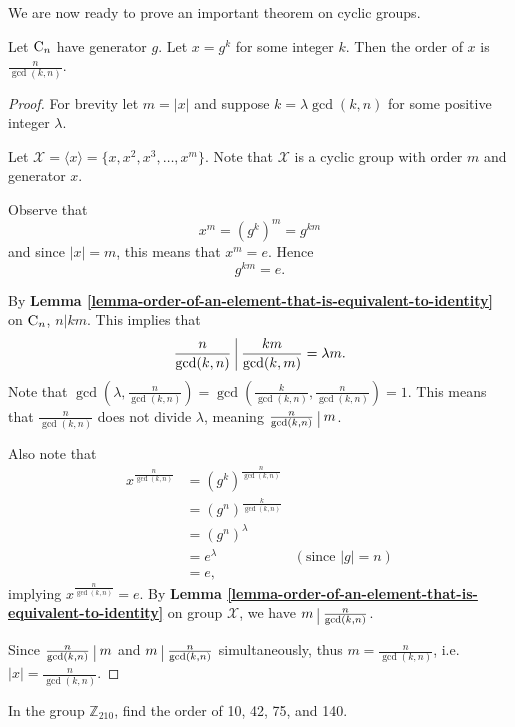 We are now ready to prove an important theorem on cyclic groups.
\begin{theorem}\label{thrm-order-of-element-in-cyclic-group}
    Let $\mathrm{C}_{n}$ have generator $g$. Let $x = g^k$ for some integer $k$. Then the order of $x$ is $\frac{n}{\gcd(k,n)}$.
\end{theorem}
\begin{proof}
    For brevity let $m = |x|$ and suppose $k = \lambda \gcd(k, n)$ for some positive integer $\lambda$.

    Let $\mathcal{X} = \langle x \rangle = \{x, x^2, x^3, \dots, x^m\}$. Note that $\mathcal{X}$ is a cyclic group with order $m$ and generator $x$.

    Observe that
    \[
        x^m = \left(g^k\right)^m = g^{km}
    \]
    and since $|x| = m$, this means that $x^m = e$. Hence
    \[
        g^{km} = e.
    \]

    By \textbf{Lemma \ref{lemma-order-of-an-element-that-is-equivalent-to-identity}} on $\mathrm{C}_{n}$, $n \vert km$. This implies that
    \[
        \frac{n}{\gcd(k,n)} \ \vline \ \frac{km}{\gcd(k,m)} = \lambda m.
    \]
    Note that $\gcd\left(\lambda, \frac{n}{\gcd(k,n)}\right) = \gcd\left(\frac{k}{\gcd(k,n)}, \frac{n}{\gcd(k,n)}\right) = 1$. This means that $\frac{n}{\gcd(k,n)}$ does not divide $\lambda$, meaning $\frac{n}{\gcd(k,n)} \ \vline \ m$.

    Also note that
    \begin{align*}
        x^{\frac{n}{\gcd(k,n)}} &= \left(g^k\right)^{\frac{n}{\gcd(k,n)}}\\
        &= \left(g^n\right)^{\frac{k}{\gcd(k,n)}}\\
        &= \left(g^n\right)^\lambda\\
        &= e^\lambda & (\text{since } |g| = n)\\
        &= e,
    \end{align*}
    implying $x^{\frac{n}{\gcd(k,n)}} = e$. By \textbf{Lemma \ref{lemma-order-of-an-element-that-is-equivalent-to-identity}} on group $\mathcal{X}$, we have $m \ \vline \ \frac{n}{\gcd(k,n)}$.

    Since $\frac{n}{\gcd(k,n)} \ \vline \ m$ and $m \ \vline \ \frac{n}{\gcd(k,n)}$ simultaneously, thus $m = \frac{n}{\gcd(k,n)}$, i.e. $|x| = \frac{n}{\gcd(k,n)}$.
\end{proof}

\begin{exercise}
    In the group $\mathbb{Z}_{210}$, find the order of 10, 42, 75, and 140.
\end{exercise}

